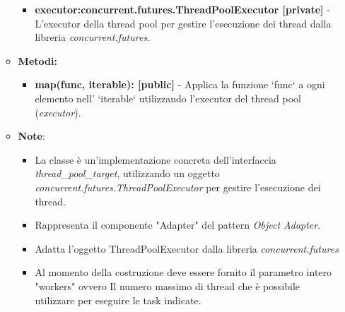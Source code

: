 \begin{itemize}
\begin{itemize}
        \begin{itemize}
            \item \textbf{executor:concurrent.futures.ThreadPoolExecutor [private]} - L'executor della thread pool per gestire l'esecuzione dei thread dalla libreria \textit{concurrent.futures}. 
        \end{itemize}
        \item \textbf{Metodi: }
        \begin{itemize}
            \item \textbf{map(func, iterable): [public]} - Applica la funzione `func` a ogni elemento nell' `iterable` utilizzando l'executor del thread pool (\textit{executor}).
        \end{itemize}
        \item\textbf{Note}:
        \begin{itemize}
            \item La classe è un'implementazione concreta dell'interfaccia \textit{thread\_pool\_target}, utilizzando un oggetto \textit{concurrent.futures.ThreadPoolExecutor} per gestire l'esecuzione dei thread.
            \item Rappresenta il componente "Adapter" del pattern \textit{Object Adapter}.
            \item Adatta l'oggetto ThreadPoolExecutor dalla libreria \textit{concurrent.futures}
            \item Al momento della costruzione deve essere fornito il parametro intero "workers" ovvero
            Il numero massimo di thread che è possibile utilizzare per eseguire le task indicate.
        \end{itemize}
    \end{itemize}
\end{itemize}


